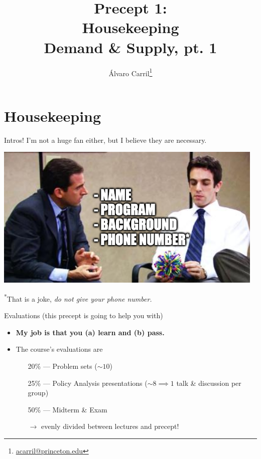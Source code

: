 \documentclass[10pt]{beamer}
\title{Precept 1: \\ Housekeeping \\ Demand \& Supply, pt. 1}
\author{Álvaro Carril\thanks{\url{acarril@princeton.edu}}}
\institute{511c - Microeconomics \\ Princeton University}
\begin{document}
\begin{frame}
    \maketitle
\end{frame}

\section{Housekeeping}

\begin{frame}{Intros!}
    I'm not a huge fan either, but I believe they are necessary.
    \begin{center}
        \includegraphics[width=\textwidth]{grief_counseling.png}
    \end{center}
    \textsuperscript{*}That is a joke, \emph{do not give your phone number.}
\end{frame}

\begin{frame}{Evaluations (this precept is going to help you with)}
    \begin{itemize}
        \item \textbf{My job is that you (a) learn and (b) pass.}
        \item The course's evaluations are
        \begin{enumerate}
            \item[20\%] --- Problem sets (\(\sim 10\))
            \item[25\%] --- Policy Analysis presentations (\(\sim 8 \implies 1 \) talk \& discussion per group)
            \item[50\%] --- Midterm \& Exam
            \item[] 
            \item[\(\rightarrow\)] evenly divided between lectures and precept! 
        \end{enumerate}
    \end{itemize}
\end{frame}
\end{document}
